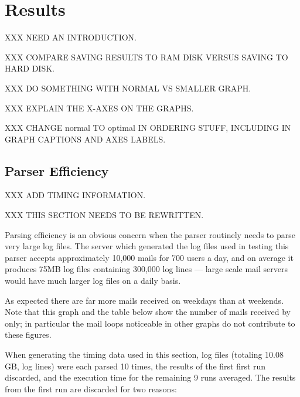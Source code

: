 \section{Results}

XXX NEED AN INTRODUCTION\@.

XXX COMPARE SAVING RESULTS TO RAM DISK VERSUS SAVING TO HARD DISK\@.

XXX DO SOMETHING WITH NORMAL VS SMALLER GRAPH\@.

XXX EXPLAIN THE X-AXES ON THE GRAPHS\@.

XXX CHANGE normal TO optimal IN ORDERING STUFF, INCLUDING IN GRAPH CAPTIONS
AND AXES LABELS\@.

\subsection{Parser Efficiency}

\label{parser efficiency}

XXX ADD TIMING INFORMATION\@.

XXX THIS SECTION NEEDS TO BE REWRITTEN\@.

Parsing efficiency is an obvious concern when the parser routinely needs to
parse very large log files.  The server which generated the log files used
in testing this parser accepts approximately 10,000 mails for 700 users a
day, and on average it produces 75MB log files containing 300,000 log lines
--- large scale mail servers would have much larger log files on a daily
basis.


As expected there are far more mails received on weekdays than at weekends.
Note that this graph and the table below show the number of mails received
by \SMTP{} only; in particular the mail loops noticeable in other graphs
do not contribute to these figures.



When generating the timing data used in this section, \numberOFlogFILES{}
log files (totaling 10.08 GB, \numberOFlogLINEShuman{} log lines) were each
parsed 10 times, the results of the first first run discarded, and the
execution time for the remaining 9 runs averaged.  The results from the
first run are discarded for two reasons:

